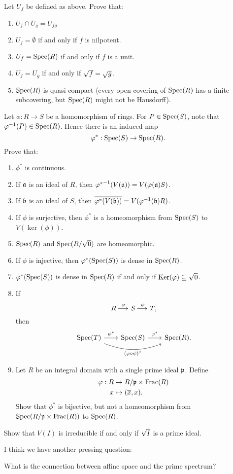 \documentclass{ximera}
\begin{document}
\begin{exercise}%
  Let $U_f$ be defined as above. Prove that:
  \begin{enumerate}
  \item $U_f \cap U_g = U_{fg}$
  \item $U_f = \emptyset$ if and only if $f$ is nilpotent.
  \item $U_f = \operatorname{Spec}(R)$ if and only if $f$ is a unit.
  \item $U_f = U_g$ if and only if $\sqrt{f} = \sqrt{g}$.
  \item $\operatorname{Spec}(R)$ is quasi-compact (every open covering of $\operatorname{Spec}(R)$
    has a finite subcovering, but $\operatorname{Spec}(R)$ might not be Hausdorff).
  \end{enumerate}
\end{exercise}


\begin{exercise}%
  Let $\phi:R \to S$ be a homomorphism of rings. For $P\in\operatorname{Spec}(S)$,
  note that $\varphi^{-1}(P) \in \operatorname{Spec}(R)$. Hence there is an induced map
  \[
  \varphi^*:\operatorname{Spec}(S) \to \operatorname{Spec}(R). 
  \]
  Prove that:
  \begin{enumerate}
  \item $\phi^*$ is continuous.
  \item If $\mathfrak{a}$ is an ideal of $R$, then ${\varphi^*}^{-1}(V(\mathfrak{a})) =
    V(\varphi(\mathfrak{a}) S)$.
  \item If $\mathfrak{b}$ is an ideal of $S$, then $\overline{\varphi^*(V(\mathfrak{b}))} =
    V(\varphi^{-1}(\mathfrak{b})R)$.
  \item If $\phi$ is surjective, then $\phi^*$ is a homeomorphism from
    $\operatorname{Spec}(S)$ to $V(\ker(\phi))$.
  \item $\operatorname{Spec}(R)$ and $\operatorname{Spec}(R/\sqrt{0})$ are homeomorphic.
  \item If $\phi$ is injective, then $\varphi^*(\operatorname{Spec}(S))$ is dense in
    $\operatorname{Spec}(R)$.
  \item $\varphi^*(\operatorname{Spec}(S))$ is dense in $\operatorname{Spec}(R)$ if and only if
    $\mathop{\mathrm{Ker}}\nolimits(\varphi)\subseteq \sqrt{0}$.
  \item If
    \[
    R\mathop{\longrightarrow\,}\limits^\varphi S \mathop{\longrightarrow\,}\limits^\psi T,
    \]
    then
    \[
    \begin{tikzcd}[column sep=2em]
      \spec(T) \ar[r, "\psi^*"] \ar[rr, "(\phi \circ \psi)^*"', bend right=20]
      & \spec(S) \ar[r, "\phi^*"]
      & \spec(R).
    \end{tikzcd}
    \]
  \item Let $R$ be an integral domain with a single prime ideal $\mathfrak{p}$.
    Define
    \begin{align*}
      \varphi:R &\to R/\mathfrak{p} \times \operatorname{Frac}(R)\\
      x &\mapsto (\overline{x}, x).
    \end{align*}
    Show that $\phi^*$ is bijective, but not a homeomorphism from
    $\operatorname{Spec}(R/\mathfrak{p} \times \operatorname{Frac}(R))$ to $\operatorname{Spec}(R)$.
  \end{enumerate}
\end{exercise}


\begin{exercise}%
  Show that $V(I)$ is irreducible if and only if $\sqrt{I}$ is a prime
  ideal.
\end{exercise}



I think we have another pressing question:

\begin{question}
  What is the connection between affine space and the prime spectrum?
\end{question}
\end{document}
